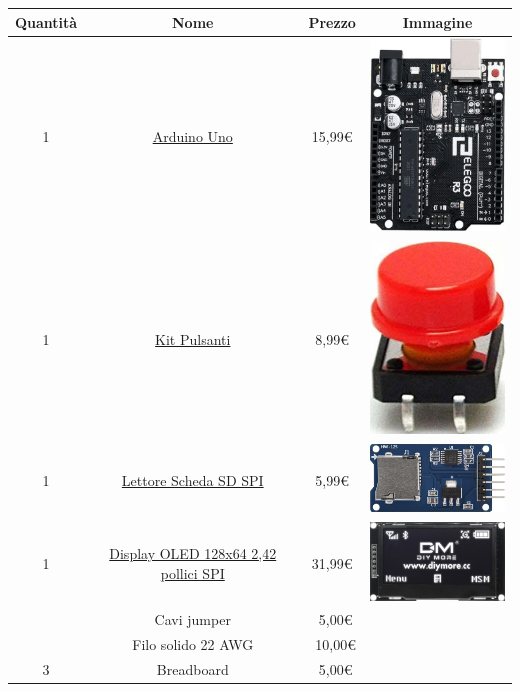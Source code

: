 \documentclass[a4paper,12pt]{article}
\begin{document}
\begin{center}
	\begin{tabular}{||c|c|c|c||}
		\hline
		Quantit\`a & Nome & Prezzo & Immagine \\
		\hline\hline
		1 & \href{https://www.amazon.it/dp/B01MRJR8UF}{Arduino Uno} & 15,99\euro & \includegraphics[width=4cm]{arduino} \\
		\hline
		1 & \href{https://www.amazon.it/dp/B07WPBQXJ9}{Kit Pulsanti} & 8,99\euro & \includegraphics[width=4cm]{pulsanti} \\
		\hline
		1 & \href{https://www.amazon.it/dp/B06X1DX5WS}{Lettore Scheda SD SPI} & 5,99\euro & \includegraphics[width=4cm]{lettoreSD} \\
		\hline
		1 & \href{https://www.amazon.it/dp/B07G223CFP}{Display OLED 128x64 2,42 pollici SPI} & 31,99\euro & \includegraphics[width=4cm]{display} \\
		\hline
		& Cavi jumper & ~5,00\euro & \\
		\hline
		& Filo solido 22 AWG & ~10,00\euro & \\
		\hline
		3 & Breadboard & ~5,00\euro & \\
		\hline
\end{tabular}
\end{center}
\end{document}
